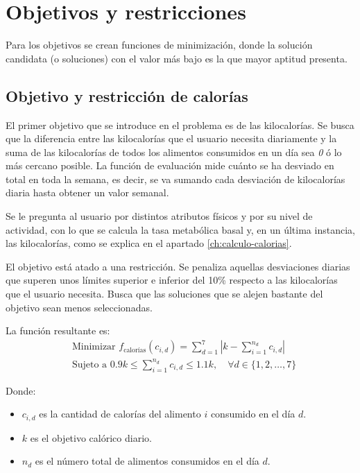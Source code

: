 \section{Objetivos y restricciones}
\label{ch:objetivo-restricciones}

Para los objetivos se crean funciones de minimización, donde la solución candidata (o soluciones) con el valor más bajo es la que mayor aptitud presenta.

\subsection{Objetivo y restricción de calorías}
\label{ch:objetivo-restriccion-calorias}

El primer objetivo que se introduce en el problema es de las kilocalorías. Se busca que la diferencia entre las kilocalorías que el usuario necesita diariamente y la suma de las kilocalorías de todos los alimentos consumidos en un día sea \textit{0} ó lo más cercano posible. La función de evaluación mide cuánto se ha desviado en total en toda la semana, es decir, se va sumando cada desviación de kilocalorías diaria hasta obtener un valor semanal.

Se le pregunta al usuario por distintos atributos físicos y por su nivel de actividad, con lo que se calcula la tasa metabólica basal y, en un última instancia, las kilocalorías, como se explica en el apartado \ref{ch:calculo-calorias}.

El objetivo está atado a una restricción. Se penaliza aquellas desviaciones diarias que superen unos límites superior e inferior del 10\% respecto a las kilocalorías que el usuario necesita. Busca que las soluciones que se alejen bastante del objetivo sean menos seleccionadas.

La función resultante es:
\[
\begin{aligned}
& \text{Minimizar } f_{\text{calorías}}(c_{i,d}) = \sum_{d=1}^{7} \left| k - \sum_{i=1}^{n_d} c_{i,d} \right| \\
& \text{Sujeto a } 0.9k \leq \sum_{i=1}^{n_d} c_{i,d} \leq 1.1k, \quad \forall d \in \{1, 2, \ldots, 7\}
\end{aligned}
\]
\newpage
\begin{small}
    Donde:
    \begin{itemize}
    \item \( c_{i,d} \) es la cantidad de calorías del alimento \( i \) consumido en el día \( d \).
    \item \( k \) es el objetivo calórico diario.
    \item \( n_d \) es el número total de alimentos consumidos en el día \( d \).
    \end{itemize}
\end{small}


